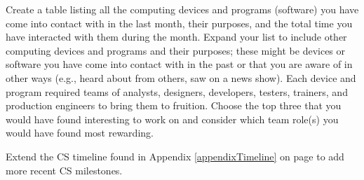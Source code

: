 \begin{ex}
	Create a table listing all the computing devices and programs (software) you have come into contact with in the last month, their purposes, and the total time you have interacted with them during the month. Expand your list to include other computing devices and programs and their purposes; these might be devices or software you have come into contact with in the past or that you are aware of in other ways (e.g., heard about from others, saw on a news show). Each device and program required teams of analysts, designers, developers, testers, trainers, and production engineers to bring them to fruition. Choose the top three that you would have found interesting to work on and consider which team role(s) you would have found most rewarding.
	 
\end{ex}

\begin{ex}\label{exCh18Timeline}
	Extend the CS timeline found in Appendix \ref{appendixTimeline} on page \pageref{appendixTimeline} to add more recent CS milestones.
\end{ex}